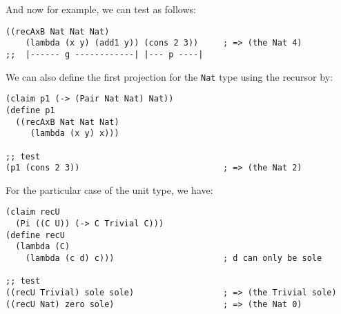 And now for example, we can test as follows:
{
  \small
\begin{verbatim}
((recAxB Nat Nat Nat) 
    (lambda (x y) (add1 y)) (cons 2 3))     ; => (the Nat 4)
;;  |------ g ------------| |--- p ----|
\end{verbatim}
}

We can also define the first projection for the \texttt{Nat} type
using the recursor by:
{
  \small
\begin{verbatim}
(claim p1 (-> (Pair Nat Nat) Nat))
(define p1
  ((recAxB Nat Nat Nat)
     (lambda (x y) x)))

;; test
(p1 (cons 2 3))                             ; => (the Nat 2)
\end{verbatim}
}

For the particular case of the unit type, we have:
{
  \small
\begin{verbatim}
(claim recU
  (Pi ((C U)) (-> C Trivial C)))
(define recU
  (lambda (C)
    (lambda (c d) c)))                      ; d can only be sole

;; test
((recU Trivial) sole sole)                  ; => (the Trivial sole)
((recU Nat) zero sole)                      ; => (the Nat 0)
\end{verbatim}
}




